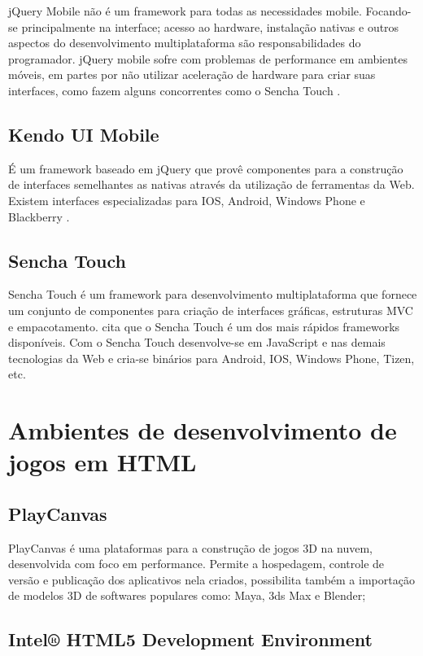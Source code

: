 jQuery Mobile não é um framework para todas as necessidades mobile.
Focando-se principalmente na interface; acesso ao hardware, instalação
nativas e outros aspectos do desenvolvimento multiplataforma
são responsabilidades do programador. jQuery mobile sofre com
problemas de performance em ambientes móveis, em partes por não
utilizar aceleração de hardware para criar suas interfaces,
como fazem alguns concorrentes como o Sencha Touch \autocite[p.
14]{viabilityBusinessApplications}.

\section{Kendo UI Mobile}

É um framework baseado em jQuery que provê componentes para a
construção de interfaces semelhantes as nativas através da
utilização de ferramentas da Web. Existem interfaces especializadas
para IOS, Android, Windows Phone e Blackberry \autocite{kendoui}.

\section{Sencha Touch}

Sencha Touch é um framework para desenvolvimento multiplataforma
que fornece um conjunto de componentes para criação de
interfaces gráficas, estruturas MVC e empacotamento. \citet[p.
14]{viabilityBusinessApplications} cita que o Sencha Touch é um dos
mais rápidos frameworks disponíveis. Com o Sencha Touch desenvolve-se
em JavaScript e nas demais tecnologias da Web e cria-se binários para
Android, IOS, Windows Phone, Tizen, etc.

\chapter{Ambientes de desenvolvimento de jogos em HTML}

\section{PlayCanvas}

PlayCanvas é uma plataformas para a construção de jogos 3D
na nuvem, desenvolvida com foco em performance. Permite a hospedagem,
controle de versão e publicação dos aplicativos nela criados,
possibilita também a importação de modelos 3D de softwares populares
como: Maya, 3ds Max e Blender;

\section{Intel® HTML5 Development Environment}

